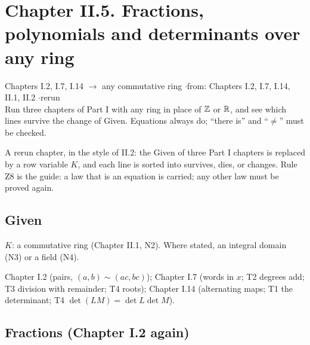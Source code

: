 \newpage

\section*{Chapter II.5. Fractions, polynomials and determinants over any ring}
\begin{center}
{\normalsize Chapters I.2, I.7, I.14 $\to$ any commutative ring \quad$\cdot$\quad from: Chapters I.2, I.7, I.14, II.1, II.2 \quad$\cdot$\quad rerun}\\[4pt]
{\small Run three chapters of Part I with any ring in place of $\mathbb{Z}$ or $\mathbb{R}$, and see which lines survive the change of Given. Equations always do; ``there is'' and ``$\ne$'' must be checked.}
\end{center}

A rerun chapter, in the style of II.2: the Given of three Part I chapters is replaced by a row variable $K$, and each line is sorted into survives, dies, or changes. Rule Z8 is the guide: a law that is an equation is carried; any other law must be proved again.

\subsection*{Given}

\begin{lines}
\item[\lab{G1}] $K$: a commutative ring (Chapter II.1, N2). Where stated, an integral domain (N3) or a field (N4).
\item[\lab{G2}] Chapter I.2 (pairs, $(a, b) \sim (ac, bc)$); Chapter I.7 (words in $x$; T2 degrees add; T3 division with remainder; T4 roots); Chapter I.14 (alternating maps; T1 the determinant; T4 $\det(LM) = \det L \det M$).
\end{lines}

\subsection*{Fractions (Chapter I.2 again)}

